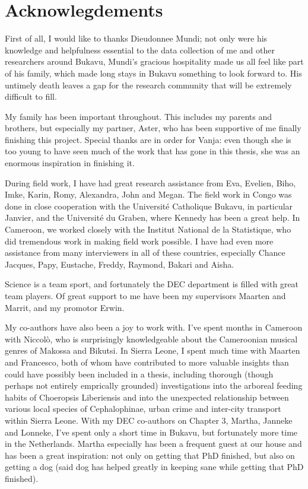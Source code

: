 \chapter*{Acknowlegdements}
First of all, I would like to thanks Dieudonnee Mundi; not only were his knowledge and helpfulness essential to the data collection of me and other researchers around Bukavu, Mundi's gracious hospitality made us all feel like part of his family, which made long stays in Bukavu something to look forward to. His untimely death leaves a gap for the research community that will be extremely difficult to fill.

My family has been important throughout. This includes my parents and brothers, but especially my partner, Aster, who has been supportive of me finally finishing this project. Special thanks are in order for Vanja: even though she is too young to have seen much of the work that has gone in this thesis, she was an enormous inspiration in finishing it.

During field work, I have had great research assistance from Eva, Evelien, Biho, Imke, Karin, Romy, Alexandra, John and Megan. The field work in Congo was done in close cooperation with the Université Catholique Bukavu, in particular Janvier, and the Université du Graben, where Kennedy has been a great help. In Cameroon, we worked closely with the Institut National de la Statistique, who did tremendous work in making field work possible. I have had even more assistance from many interviewers in all of these countries, especially Chance Jacques, Papy, Eustache, Freddy, Raymond, Bakari and Aisha. 

Science is a team sport, and fortunately the DEC department is filled with great team players. Of great support to me have been my supervisors Maarten and Marrit, and my promotor Erwin. 

My co-authors have also been a joy to work with. I've spent months in Cameroon with Niccolò, who is surprisingly knowledgeable about the Cameroonian musical genres of Makossa and Bikutsi. In Sierra Leone, I spent much time with Maarten and Francesco, both of whom have contributed to more valuable insights than could have possibly been included in a thesis, including thorough (though perhaps not entirely emprically grounded) investigations into the arboreal feeding habits of Choeropsis Liberiensis and into the unexpected relationship between various local species of Cephalophinae, urban crime and inter-city transport within Sierra Leone. With my DEC co-authors on Chapter 3, Martha, Janneke and Lonneke, I've spent only a short time in Bukavu, but fortunately more time in the Netherlands. Martha especially has been a frequent guest at our house and has been  a great inspiration: not only on getting that PhD finished, but also on getting a dog (said dog has helped greatly in keeping sane while getting that PhD finished).

